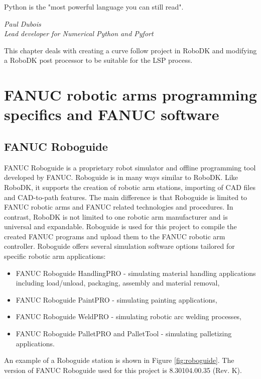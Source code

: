 \label{chap:implementation}

\epigraph{Python is the "most powerful language you can still read".}{\textit{Paul Dubois \\ Lead developer for Numerical Python and Pyfort }}

This chapter deals with creating a curve follow project in RoboDK and modifying a RoboDK post processor to be suitable for the LSP process.

\section{FANUC robotic arms programming specifics and FANUC software}

\subsection{FANUC Roboguide}

FANUC Roboguide is a proprietary robot simulator and offline programming tool developed by FANUC. Roboguide is in many ways similar to RoboDK.  Like RoboDK, it supports the creation of robotic arm stations, importing of CAD files and CAD-to-path features. The main difference is that Roboguide is limited to FANUC robotic arms and FANUC related technologies and procedures. In contrast, RoboDK is not limited to one robotic arm manufacturer and is universal and expandable. Roboguide is used for this project to compile the created FANUC programs and upload them to the FANUC robotic arm controller. Roboguide offers several simulation software options tailored for specific robotic arm applications:

\begin{itemize}

\item FANUC Roboguide HandlingPRO - simulating material handling applications including load/unload, packaging, assembly and material removal,
\item FANUC Roboguide PaintPRO - simulating painting applications,
\item FANUC Roboguide WeldPRO - simulating robotic arc welding processes,
\item FANUC Roboguide PalletPRO and PalletTool - simulating palletizing applications.

\end{itemize}

An example of a Roboguide station is shown in Figure \ref{fig:roboguide}. The version of FANUC Roboguide used for this project is 8.30104.00.35 (Rev. K). 

